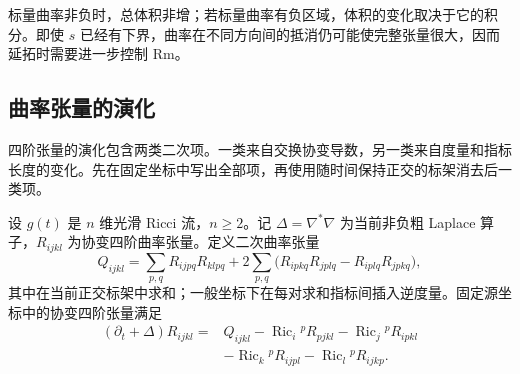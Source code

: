 标量曲率非负时，总体积非增；若标量曲率有负区域，体积的变化取决于它的积分。即使 \(s\) 已经有下界，曲率在不同方向间的抵消仍可能使完整张量很大，因而延拓时需要进一步控制 \(\mathrm{Rm}\)。

\subsection{曲率张量的演化}
\label{g3:subsec:2703:02}
四阶张量的演化包含两类二次项。一类来自交换协变导数，另一类来自度量和指标长度的变化。先在固定坐标中写出全部项，再使用随时间保持正交的标架消去后一类项。

\begin{proposition}\label{g3:prop:ricci-flow-full-curvature}
	设 \(g(t)\) 是 \(n\) 维光滑 Ricci 流，\(n\ge2\)。记 \(\Delta=\nabla^*\nabla\) 为当前非负粗 Laplace 算子，\(R_{ijkl}\) 为协变四阶曲率张量。定义二次曲率张量
	\begin{equation}\label{g3:eq:ricci-flow-quadratic-curvature}
		Q_{ijkl}
		=\sum_{p,q}R_{ijpq}R_{klpq}
		+2\sum_{p,q}\bigl(R_{ipkq}R_{jplq}-R_{iplq}R_{jpkq}\bigr),
	\end{equation}
	其中在当前正交标架中求和；一般坐标下在每对求和指标间插入逆度量。固定源坐标中的协变四阶张量满足
	\begin{equation}\label{g3:eq:ricci-flow-curvature-coordinate-evolution}
		\begin{split}
		(\partial_t+\Delta)R_{ijkl}={}&Q_{ijkl}
		-\operatorname{Ric}_i{}^pR_{pjkl}
		-\operatorname{Ric}_j{}^pR_{ipkl}\\
		&-\operatorname{Ric}_k{}^pR_{ijpl}
		-\operatorname{Ric}_l{}^pR_{ijkp}.
		\end{split}
	\end{equation}
\end{proposition}
